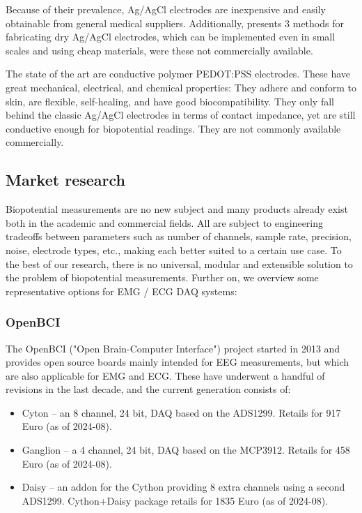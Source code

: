 \documentclass{thesis}
\begin{document}
Because of their prevalence, Ag/AgCl electrodes are inexpensive and easily obtainable from general medical suppliers. Additionally, \cite{Lee2022} presents 3 methods for fabricating dry Ag/AgCl electrodes, which can be implemented even in small scales and using cheap materials, were these not commercially available.

The state of the art are conductive polymer PEDOT:PSS electrodes. These have great mechanical, electrical, and chemical properties: They adhere and conform to skin, are flexible, self-healing, and have good biocompatibility. They only fall behind the classic Ag/AgCl electrodes in terms of contact impedance, yet are still conductive enough for biopotential readings. They are not commonly available commercially. \cite{Seiti2023,Hou2024}

\subsection{Market research}

Biopotential measurements are no new subject and many products already exist both in the academic and commercial fields. All are subject to engineering tradeoffs between parameters such as number of channels, sample rate, precision, noise, electrode types, etc., making each better suited to a certain use case. To the best of our research, there is no universal, modular and extensible solution to the problem of biopotential measurements. Further on, we overview some representative options for EMG / ECG DAQ systems:

\subsubsection*{OpenBCI}

The OpenBCI ("Open Brain-Computer Interface") project started in 2013 and provides open source boards mainly intended for EEG measurements, but which are also applicable for EMG and ECG. These have underwent a handful of revisions in the last decade, and the current generation consists of:

\begin{itemize}
    \item Cyton -- an 8 channel, 24 bit, DAQ based on the ADS1299. Retails for 917 Euro (as of 2024-08).
    \item Ganglion -- a 4 channel, 24 bit, DAQ based on the MCP3912. Retails for 458 Euro (as of 2024-08).
    \item Daisy -- an addon for the Cython providing 8 extra channels using a second ADS1299. Cython+Daisy package retails for 1835 Euro (as of 2024-08).
\end{itemize}
\end{document}
